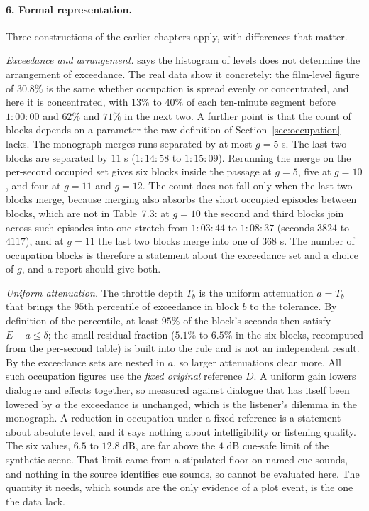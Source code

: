 \paragraph{6. Formal representation.} Three constructions of the earlier chapters apply, with differences that matter.

\emph{Exceedance and arrangement.}  says the histogram of levels does not determine the arrangement of exceedance. The real data show it concretely: the film-level figure of $30.8\%$ is the same whether occupation is spread evenly or concentrated, and here it is concentrated, with $13\%$ to $40\%$ of each ten-minute segment before $1{:}00{:}00$ and $62\%$ and $71\%$ in the next two. A further point is that the count of blocks depends on a parameter the raw definition of Section~\ref{sec:occupation} lacks. The monograph merges runs separated by at most $g=5$ s. The last two blocks are separated by $11$ s ($1{:}14{:}58$ to $1{:}15{:}09$). Rerunning the merge on the per-second occupied set gives six blocks inside the passage at $g=5$, five at $g=10$, and four at $g=11$ and $g=12$. The count does not fall only when the last two blocks merge, because merging also absorbs the short occupied episodes between blocks, which are not in Table~7.3: at $g=10$ the second and third blocks join across such episodes into one stretch from $1{:}03{:}44$ to $1{:}08{:}37$ (seconds $3824$ to $4117$), and at $g=11$ the last two blocks merge into one of $368$ s. The number of occupation blocks is therefore a statement about the exceedance set and a choice of $g$, and a report should give both.

\emph{Uniform attenuation.} The throttle depth $T_b$ is the uniform attenuation $a=T_b$ that brings the $95$th percentile of exceedance in block $b$ to the tolerance. By definition of the percentile, at least $95\%$ of the block's seconds then satisfy $E-a\le\delta$; the small residual fraction ($5.1\%$ to $6.5\%$ in the six blocks, recomputed from the per-second table) is built into the rule and is not an independent result. By  the exceedance sets are nested in $a$, so larger attenuations clear more. All such occupation figures use the \emph{fixed original} reference $D$. A uniform gain lowers dialogue and effects together, so measured against dialogue that has itself been lowered by $a$ the exceedance is unchanged, which is the listener's dilemma in the monograph. A reduction in occupation under a fixed reference is a statement about absolute level, and it says nothing about intelligibility or listening quality. The six values, $6.5$ to $12.8$ dB, are far above the $4$ dB cue-safe limit of the synthetic scene. That limit came from a stipulated floor on named cue sounds, and nothing in the source identifies cue sounds, so  cannot be evaluated here. The quantity it needs, which sounds are the only evidence of a plot event, is the one the data lack.


